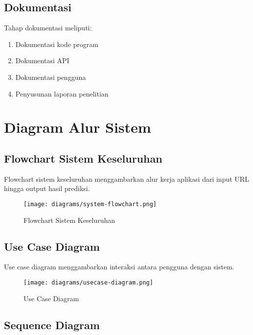 \subsection{Dokumentasi}

Tahap dokumentasi meliputi:
\begin{enumerate}
    \item Dokumentasi kode program
    \item Dokumentasi API
    \item Dokumentasi pengguna
    \item Penyusunan laporan penelitian
\end{enumerate}

\section{Diagram Alur Sistem}

\subsection{Flowchart Sistem Keseluruhan}

Flowchart sistem keseluruhan menggambarkan alur kerja aplikasi dari input URL hingga output hasil prediksi.

\begin{figure}[htbp]
    \centering
    \texttt{[image: diagrams/system-flowchart.png]}
    \caption{Flowchart Sistem Keseluruhan}
    \label{fig:system-flowchart}
\end{figure}

\clearpage

\subsection{Use Case Diagram}

Use case diagram menggambarkan interaksi antara pengguna dengan sistem.

\begin{figure}[htbp]
    \centering
    \texttt{[image: diagrams/usecase-diagram.png]}
    \caption{Use Case Diagram}
    \label{fig:usecase}
\end{figure}

\clearpage

\subsection{Sequence Diagram}

